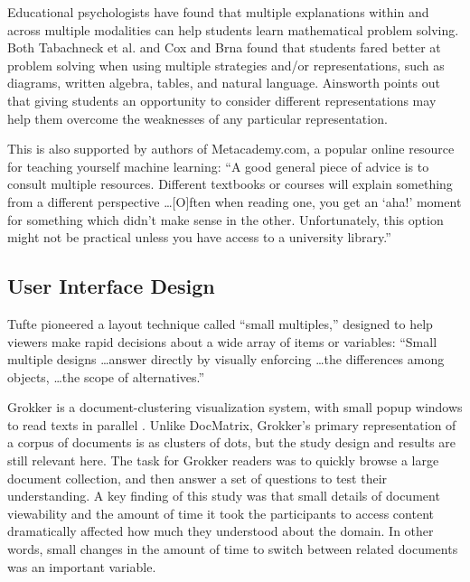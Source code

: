 Educational psychologists have found that multiple explanations within and across multiple modalities can help students learn mathematical problem solving. Both Tabachneck et al. \cite{Tabachneck} and Cox and Brna \cite{cox} found that students fared better at problem solving when using multiple strategies and/or representations, such as diagrams, written algebra, tables, and natural language. Ainsworth points out that giving students an opportunity to consider different representations may help them overcome the weaknesses of any particular representation.

This is also supported by authors of Metacademy.com, a popular online resource for teaching yourself machine learning: ``A good general piece of advice is to consult multiple resources. Different textbooks or courses will explain something from a different perspective \ldots [O]ften when reading one, you get an ‘aha!’ moment for something which didn't make sense in the other. Unfortunately, this option might not be practical unless you have access to a university library.'' \cite{metacademy}

\subsection{User Interface Design}
Tufte pioneered a layout technique called ``small multiples,'' designed to help viewers make rapid decisions about a wide array of items or variables: ``Small multiple designs \ldots answer directly by visually enforcing \ldots the differences among objects, \ldots the scope of alternatives.'' %


Grokker is a document-clustering visualization system, with small popup windows to read texts in parallel \cite{slaney}. Unlike DocMatrix, Grokker's primary representation of a corpus of documents is as clusters of dots, but the study design and results are still relevant here. The task for Grokker readers was to quickly browse a large document collection, and then answer a set of questions to test their understanding. A key finding of this study was that small details of document viewability and the amount of time it took the participants to access content dramatically affected how much they understood about the domain.  In other words, small changes in the amount of time to switch between related documents was an important variable.  


